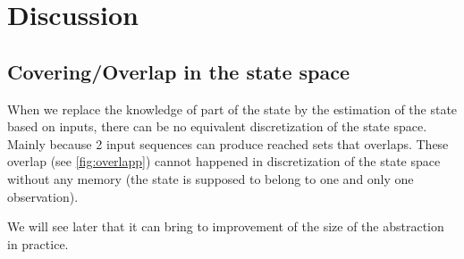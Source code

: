 \section{Discussion}
%

\subsection{Covering/Overlap in the state space}
When we replace the knowledge of part of the state by the estimation of the state based on inputs, there can be no equivalent discretization of the state space.
Mainly because 2 input sequences can produce reached sets that overlaps.
These overlap (see \ref{fig:overlapp}) cannot happened in discretization of the state space without any memory (the state is supposed to belong to one and only one observation).

We will see later that it can bring to improvement of the size of the abstraction in practice.

